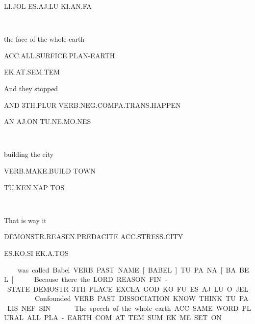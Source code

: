 {{LI.JOL			ES.AJ.LU		KI.AN.FA	 

\li\jol~\es\aj\lu~\ki\an\fa
\drie
 

 

the face of the whole earth 

ACC.ALL.SURFICE.PLAN-EARTH 

EK.AT.SEM.TEM 

\ek\at\sem\tem
\drie

 

And 	they 		stopped 				 

AND	3TH.PLUR	VERB.NEG.COMPA.TRANS.HAPPEN	 

AN	AJ.ON		TU.NE.MO.NES		                               

\an~\aj\on~\tu\Atlanne\mo\nes
\drie
 

building 		the city 

VERB.MAKE.BUILD	TOWN 

TU.KEN.NAP                      TOS 

\tu\ken\nap~\tos
\drie

 

That is way 				it 			

DEMONSTR.REASEN.PREDACITE	ACC.STRESS.CITY	 

ES.KO.SI				EK.A.TOS		 

\es\ko\si~\ek\Atlana\tos 
\drie
 

was called Babel 

VERB.PAST.NAME[BABEL] 

TU.PA.NA[BA.BEL] 

\tu\pa\na\cartouche{\pa\pel}
\drie

  

Because 		there 				the LORD  

REASON.FIN-STATE          DEMOSTR.3TH.PLACE		EXCLA.GOD 

KO.FU			ES.AJ.LU			O.JEL 

\ko\fu~\es\aj\lu~\Atlano\jel
\drie

Confounded 

VERB.PAST.DISSOCIATION.KNOW.THINK	 

TU.PA.LIS.NEF.SIN                                               			 

\tu\pa\lis\nef\Atlansin
\drie

 

The speech			 of the whole earth 

ACC.SAME.WORD.PLURAL 	ALL.PLA-EARTH.COM. 

AT.TEM.SUM			EK.ME.SET.ON 

}}
